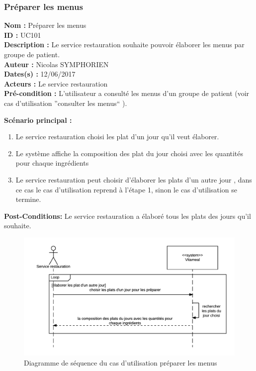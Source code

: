 \subsubsection{Préparer les menus}

\noindent\textbf{Nom :} Préparer les menus \\
\textbf{ID :} UC101 \\
\textbf{Description :} Le service restauration souhaite pouvoir élaborer les menus par groupe de patient. \\
\textbf{Auteur :} Nicolas SYMPHORIEN \\
\textbf{Dates(s) :} 12/06/2017 \\
\textbf{Acteurs :} Le service restauration \\
\textbf{Pré-condition :} L'utilisateur a consulté les menus d'un groupe de patient (voir cas d'utilisation ''consulter les menus`` ).

\noindent \textbf{Scénario principal :}

\begin{enumerate}
	\item Le service restauration choisi les plat d'un jour qu'il veut élaborer.
	\item Le système affiche la composition des plat du jour choisi avec les quantités pour chaque ingrédients
	\item Le service restauration peut choisir d'élaborer les plats d'un autre jour , dans ce cas le cas d'utilisation reprend à l'étape 1, sinon le cas d'utilisation se termine.
\end{enumerate}

\noindent \textbf{Post-Conditions:} Le service restauration a élaboré tous les plats des jours qu'il souhaite.

\begin{figure}
\centering
\includegraphics{../../CasDUtilisations/PreparerMenus/sequence_preparer_menus.png}
\caption{Diagramme de séquence du cas d'utilisation préparer les menus}
\end{figure}